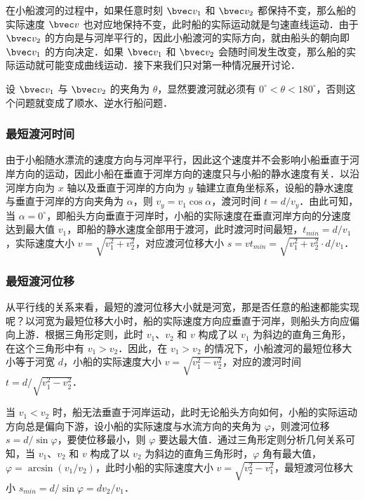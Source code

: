 在小船渡河的过程中，如果任意时刻 $\bvec v_1$ 和 $\bvec v_2$ 都保持不变，那么船的实际速度 $\bvec v$ 也对应地保持不变，此时船的实际运动就是匀速直线运动．由于 $\bvec v_2$ 的方向是与河岸平行的，因此小船渡河的实际方向，就由船头的朝向即 $\bvec v_1$ 的方向决定．如果 $\bvec v_1$ 和 $\bvec v_2$ 会随时间发生改变，那么船的实际运动就可能变成曲线运动．接下来我们只对第一种情况展开讨论．

设 $\bvec v_1$ 与 $\bvec v_2$ 的夹角为 $\theta$，显然要渡河就必须有 $0^\circ < \theta < 180^\circ $，否则这个问题就变成了顺水、逆水行船问题．

\subsubsection{最短渡河时间}

由于小船随水漂流的速度方向与河岸平行，因此这个速度并不会影响小船垂直于河岸方向的运动，因此小船在垂直于河岸方向的速度只与小船的静水速度有关．以沿河岸方向为 $x$ 轴以及垂直于河岸的方向为 $y$ 轴建立直角坐标系，设船的静水速度与垂直于河岸的方向夹角为 $\alpha$，则 $v_y = v_1 \cos \alpha$，渡河时间 $t=d/v_y$．由此可知，当 $\alpha = 0^\circ$，即船头方向垂直于河岸时，小船的实际速度在垂直河岸方向的分速度达到最大值 $v_1$，即船的静水速度全部用于渡河，此时渡河时间最短，$t_{min}=d/v_1$，实际速度大小 $v=\sqrt{v_1^2+v_2^2}$，对应渡河位移大小 $s=vt_{min}=\sqrt{v_1^2+v_2^2}\cdot d/v_1$．

\subsubsection{最短渡河位移}

从平行线的关系来看，最短的渡河位移大小就是河宽，那是否任意的船速都能实现呢？以河宽为最短位移大小时，船的实际速度方向应垂直于河岸，则船头方向应偏向上游．根据三角形定则，此时 $v_1$、$v_2$ 和 $v$ 构成了以 $v_1$ 为斜边的直角三角形，在这个三角形中有 $v_1>v_2$．因此，在 $v_1>v_2$ 的情况下，小船渡河的最短位移大小等于河宽 $d$，小船的实际速度大小 $v=\sqrt{v_1^2-v_2^2}$，对应的渡河时间 $t=d/\sqrt{v_1^2-v_2^2}$．

当 $v_1<v_2$ 时，船无法垂直于河岸运动，此时无论船头方向如何，小船的实际运动方向总是偏向下游，设小船的实际速度与水流方向的夹角为 $\varphi$，则渡河位移 $s = d/\sin \varphi$，要使位移最小，则 $\varphi$ 要达最大值．通过三角形定则分析几何关系可知，当 $v_1$、$v_2$ 和 $v$ 构成了以 $v_2$ 为斜边的直角三角形时，$\varphi$ 角有最大值，$\varphi=\arcsin(v_1/v_2)$，此时小船的实际速度大小 $v=\sqrt{v_2^2-v_1^2}$，最短渡河位移大小 $s_{min} = d/\sin \varphi=dv_2/v_1$．

